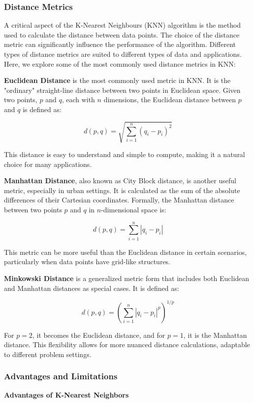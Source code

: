 \documentclass[letterpaper,10pt]{article}
\begin{document}
\subsubsection{Distance Metrics}
A critical aspect of the K-Nearest Neighbours (KNN) algorithm is the method used to calculate the distance between data points. The choice of the distance metric can significantly influence the performance of the algorithm. Different types of distance metrics are suited to different types of data and applications. Here, we explore some of the most commonly used distance metrics in KNN: \par

\textbf{Euclidean Distance} is the most commonly used metric in KNN. It is the "ordinary" straight-line distance between two points in Euclidean space. Given two points, \(p\) and \(q\), each with \(n\) dimensions, the Euclidean distance between \(p\) and \(q\) is defined as:

\[ d(p,q) = \sqrt{\sum_{i=1}^{n} (q_i - p_i)^2} \]

This distance is easy to understand and simple to compute, making it a natural choice for many applications. \par
\vspace{5pt}
\textbf{Manhattan Distance}, also known as City Block distance, is another useful metric, especially in urban settings. It is calculated as the sum of the absolute differences of their Cartesian coordinates. Formally, the Manhattan distance between two points \(p\) and \(q\) in \(n\)-dimensional space is:

\[ d(p,q) = \sum_{i=1}^{n} |q_i - p_i| \]

This metric can be more useful than the Euclidean distance in certain scenarios, particularly when data points have grid-like structures. \par
\vspace{5pt}
\textbf{Minkowski Distance} is a generalized metric form that includes both Euclidean and Manhattan distances as special cases. It is defined as:

\[ d(p,q) = (\sum_{i=1}^{n} |q_i - p_i|^p)^{1/p} \]

For \(p = 2\), it becomes the Euclidean distance, and for \(p = 1\), it is the Manhattan distance. This flexibility allows for more nuanced distance calculations, adaptable to different problem settings.


\subsubsection{Advantages and Limitations}
\textbf{Advantages of K-Nearest Neighbors}
\end{document}
